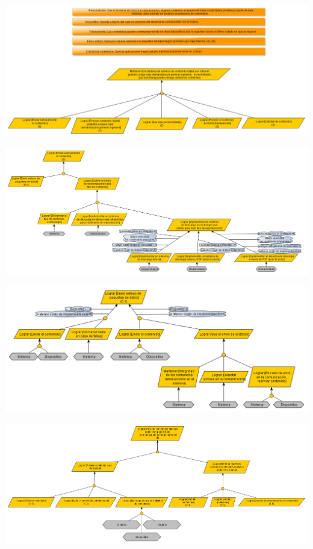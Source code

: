 \documentclass[11pt, a4paper, spanish]{article}
\begin{document}
	\begin{center}
		\includegraphics[scale=0.35]{Diagramas/ModelodeObjetivosPrincipal.png}
	\end{center}
\newpage
	\begin{center}
		\includegraphics[scale=0.50, angle=90]{Diagramas/0ModelodeObjetivosLograrenviarcontenido.png}
	\end{center}
\newpage
	\begin{center}
		\includegraphics[scale=0.65, angle=90]{Diagramas/0-1ModelodeObjetivosEnvioexitoso.png}
	\end{center}
\newpage
	\begin{center}
		\includegraphics[scale=0.50, angle=90]{Diagramas/1ModelodeObjetivosGenerarIngresos.png}
	\end{center}
\end{document}
